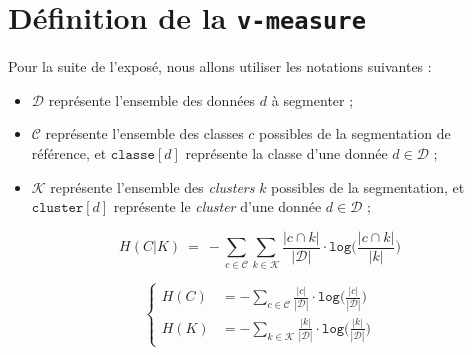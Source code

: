 \label{annex:D-ANNEXE-EVALUATION-CLUSTERING}


	\minitoc

	\section{Définition de la \texttt{v-measure}}
	\label{annex:D.1-ANNEXE-EVALUATION-CLUSTERING-DEFINITION}
	
		
		
		Pour la suite de l'exposé, nous allons utiliser les notations suivantes :
		\begin{itemize}
			\item $\mathcal{D}$ représente l'ensemble des données $d$ à segmenter ;
			\item $\mathcal{C}$ représente l'ensemble des classes $c$ possibles de la segmentation de référence, et $\texttt{classe}[d]$ représente la classe d'une donnée $d \in \mathcal{D}$ ;
			\item $\mathcal{K}$ représente l'ensemble des \textit{clusters} $k$ possibles de la segmentation, et $\texttt{cluster}[d]$ représente le \textit{cluster} d'une donnée $d \in \mathcal{D}$ ;
		\end{itemize}
		
		\begin{equation}
			\label{equation:D.1-ANNEXE-EVALUATION-CLUSTERING-DEFINITION-ENTROPTY-DUO}
			H(C|K)~=~
				-
				\sum\limits_{
					c \in \mathcal{C}
				}
				\sum\limits_{
					k \in \mathcal{K}
				}
				\frac{
					|c \cap k|
				}{
					|\mathcal{D}|
				}
				\cdot
				\texttt{log} \biggl(
					\frac{
						|c \cap k|
					}{
						|k|
					}
				\biggr)
		\end{equation}
		
		\begin{equation}
			\label{equation:D.1-ANNEXE-EVALUATION-CLUSTERING-DEFINITION-ENTROPTY-SOLO}
			\begin{cases}
				H(C)
					& =
					-
					\sum\limits_{
						c \in \mathcal{C}
					}
					\frac{
						|c|
					}{
						|\mathcal{D}|
					}
					\cdot
					\texttt{log} \biggl(
						\frac{
							|c|
						}{
							|\mathcal{D}|
						}
					\biggr) \\
				H(K)
					& =
					-
					\sum\limits_{
						k \in \mathcal{K}
					}
					\frac{
						|k|
					}{
						|\mathcal{D}|
					}
					\cdot
					\texttt{log} \biggl(
						\frac{
							|k|
						}{
							|\mathcal{D}|
						}
					\biggr)
			\end{cases}
		\end{equation}
		
